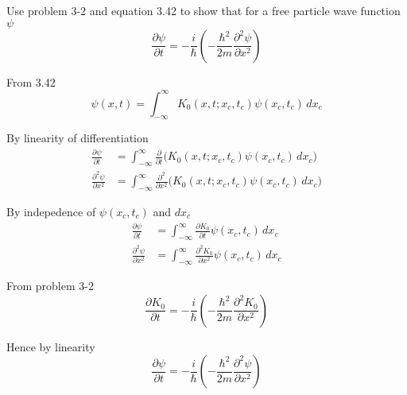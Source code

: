 \documentclass[12pt]{article}
\begin{document}
\noindent
Use problem 3-2 and equation 3.42 to show that for a free particle wave function $\psi$
\begin{equation*}
\frac{\partial\psi}{\partial t}=-\frac{i}{\hbar}
\left(-\frac{\hbar^2}{2m}\frac{\partial^2\psi}{\partial x^2}\right)
\end{equation*}

\noindent
From 3.42
\begin{equation*}
\psi(x,t)=\int_{-\infty}^\infty K_0(x,t;x_c,t_c)\psi(x_c,t_c)\,dx_c
\end{equation*}

\noindent
By linearity of differentiation
\begin{align*}
\frac{\partial\psi}{\partial t}
&=\int_{-\infty}^\infty \frac{\partial}{\partial t} \bigg(K_0(x,t;x_c,t_c)\psi(x_c,t_c)\,dx_c\bigg)
\\
\frac{\partial^2\psi}{\partial x^2}
&=\int_{-\infty}^\infty \frac{\partial^2}{\partial x^2} \bigg(K_0(x,t;x_c,t_c)\psi(x_c,t_c)\,dx_c\bigg)
\end{align*}

\noindent
By indepedence of $\psi(x_c,t_c)$ and $dx_c$
\begin{align*}
\frac{\partial\psi}{\partial t}
&=\int_{-\infty}^\infty \frac{\partial K_0}{\partial t}\psi(x_c,t_c)\,dx_c
\\
\frac{\partial^2\psi}{\partial x^2}
&=\int_{-\infty}^\infty \frac{\partial^2 K_0}{\partial x^2}\psi(x_c,t_c)\,dx_c
\end{align*}

\noindent
From problem 3-2
\begin{equation*}
\frac{\partial K_0}{\partial t}=-\frac{i}{\hbar}
\left(-\frac{\hbar^2}{2m}\frac{\partial^2 K_0}{\partial x^2}\right)
\end{equation*}

\noindent
Hence by linearity
\begin{equation*}
\frac{\partial\psi}{\partial t}=-\frac{i}{\hbar}
\left(-\frac{\hbar^2}{2m}\frac{\partial^2\psi}{\partial x^2}\right)
\end{equation*}
\end{document}

